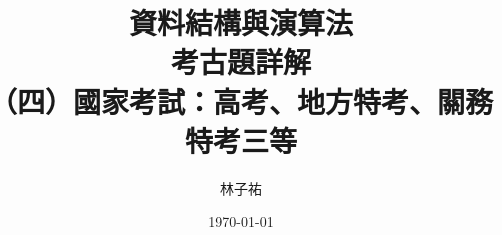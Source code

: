 \documentclass[12pt]{report}
\title{資料結構與演算法\\考古題詳解\\[0.3em]{\LARGE （四）國家考試：高考、地方特考、關務特考三等}}
\author{林子祐}
\date{\today}
\renewcommand{\chaptermark}[1]{\markboth{第~\thechapter~章\quad #1}{}}
\begin{document}
\maketitle
\romantableofcontents




\appendix
{}
\renewcommand{\chaptermark}[1]{\markboth{附錄~\thechapter\quad #1}{}}


\end{document}
